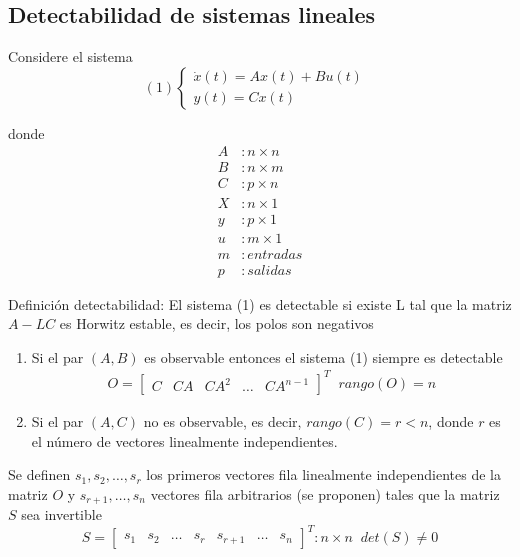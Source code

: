 \subsection{Detectabilidad de sistemas lineales}

Considere el sistema
\[(1)
    \left\{
        \begin{array}{lll}
            \dot{x}(t) = Ax(t) + Bu(t) \\
            y(t) = Cx(t)
        \end{array}
    \right. \;\;
\]

donde 
\[
     \begin{split}
        A &: n \times n \\
        B &: n \times m \\
        C &: p \times n \\
        X &: n \times 1 \\
        y &: p \times 1 \\
        u &: m \times 1 \\
        m &: entradas \\
        p &: salidas
    \end{split}
\]

Definición detectabilidad: El sistema (1) es detectable si existe L tal que la matriz \( A-LC \) es Horwitz estable, es decir, los polos son negativos

\begin{enumerate}
    \item Si el par \( (A, B) \) es observable entonces el sistema (1) siempre es detectable
    \[
    \begin{split}
        O = 
        \begin{bmatrix}
            C & CA & CA^{2} & \ldots & CA^{n-1}
        \end{bmatrix}^{T}
         \;\; rango(O)=n
    \end{split}
    \]
    
    \item Si el par \( (A, C) \) no es observable, es decir, \( rango(C)=r<n \), donde \( r \) es el número de vectores linealmente independientes. 
\end{enumerate}

Se definen \( s_{1}, s_{2}, \ldots, s_{r} \) los primeros vectores fila linealmente independientes de la matriz \( O \) y \( s_{r+1}, \ldots, s_{n} \) vectores fila arbitrarios (se proponen) tales que la matriz \( S \) sea invertible
\[
    S = \begin{bmatrix}
            s_{1} & s_{2} & \ldots & s_{r} & s_{r+1} & \ldots & s_{n}
        \end{bmatrix}^{T}:n \times n \;\; det(S) \not = 0
\]

